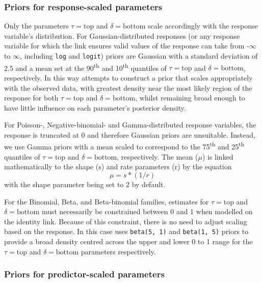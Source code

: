 \hypertarget{priors-for-response-scaled-parameters}{%
\subsubsection{Priors for response-scaled
parameters}\label{priors-for-response-scaled-parameters}}

Only the parameters \(\tau = \text{top}\) and \(\delta = \text{bottom}\)
scale accordingly with the response variable's distribution. For
Gaussian-distributed responses (or any response variable for which the
link ensures valid values of the response can take from -\(\infty\) to
\(\infty\), including \texttt{log} and \texttt{logit}) priors are
Gaussian with a standard deviation of 2.5 and a mean set at the
90\textsuperscript{th} and 10\textsuperscript{th} quantiles of
\(\tau = \text{top}\) and \(\delta = \text{bottom}\), respectively. In
this way  attempts to construct a prior that scales
appropriately with the observed data, with greatest density near the
most likely region of the response for both \(\tau = \text{top}\) and
\(\delta = \text{bottom}\), whilst remaining broad enough to have little
influence on each parameter's posterior density.

For Poisson-, Negative-binomial- and Gamma-distributed response
variables, the response is truncated at 0 and therefore Gaussian priors
are unsuitable. Instead, we use Gamma priors with a mean scaled to
correspond to the 75\textsuperscript{th} and 25\textsuperscript{th}
quantiles of \(\tau = \text{top}\) and \(\delta = \text{bottom}\),
respectively. The mean (\(\mu\)) is linked mathematically to the shape
(s) and rate parameters (r) by the equation \[ \mu = s * (1/r) \] with
the shape parameter being set to 2 by default.

For the Binomial, Beta, and Beta-binomial families, estimates for
\(\tau = \text{top}\) and \(\delta = \text{bottom}\) must necessarily be
constrained between 0 and 1 when modelled on the identity link. Because
of this constraint, there is no need to adjust scaling based on the
response. In this case  uses \texttt{beta(5,\ 1)} and
\texttt{beta(1,\ 5)} priors to provide a broad density centred across
the upper and lower 0 to 1 range for the \(\tau = \text{top}\) and
\(\delta = \text{bottom}\) parameters respectively.

\hypertarget{priors-for-predictor-scaled-parameters}{%
\subsubsection{Priors for predictor-scaled
parameters}\label{priors-for-predictor-scaled-parameters}}

